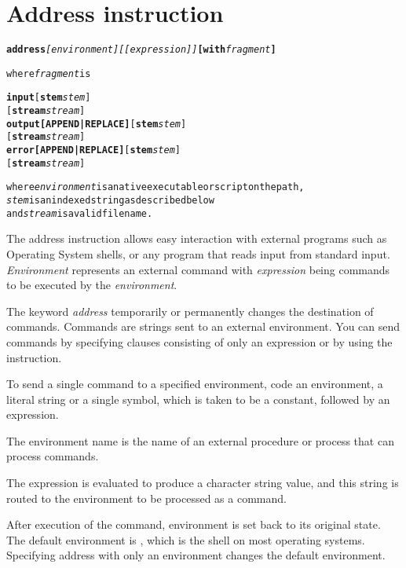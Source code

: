 \section{Address instruction}\label{refaddress}
\begin{shaded}
  \begin{alltt}
  \textbf{address} \emph{[environment]} \emph{[[expression]]} \textbf{[with} \emph{fragment}\textbf{]}

  where \emph{fragment} is
  
  \textbf{input} [\textbf{stem} \emph{stem}]
        [\textbf{stream} \emph{stream}]
	  \textbf{output} \textbf{[APPEND|REPLACE]} [\textbf{stem} \emph{stem}]
                          [\textbf{stream} \emph{stream}]
	  \textbf{error} \textbf{[APPEND|REPLACE]} [\textbf{stem} \emph{stem}]
                         [\textbf{stream} \emph{stream}]
                
where \emph{environment} is a native executable or script on the path,
\emph{stem} is an indexed string as described below
and \emph{stream} is a valid filename.
\end{alltt}

% 
\end{shaded}
The address instruction allows easy interaction with external programs such as Operating System shells, or any program that reads 
input from standard input. \emph{Environment} represents an external command with \emph{expression} being commands to be executed 
by the \emph{environment}. 

The keyword \emph{address} temporarily or permanently changes the destination of commands. Commands are strings sent to an external environment. 
You can send commands by specifying clauses consisting of only an expression or by using the  instruction.

To send a single command to a specified environment, code an
environment, a literal string or a single symbol, which is taken to be
a constant, followed by an expression.

The environment name is the
name of an external procedure or process that can process
commands.

The expression is evaluated to produce a character string
value, and this string is routed to the environment to be processed as
a command.

After execution of the command, environment is set back to
its original state. The default environment is , which is the shell
on most operating systems. Specifying address with only an environment changes the default environment.

